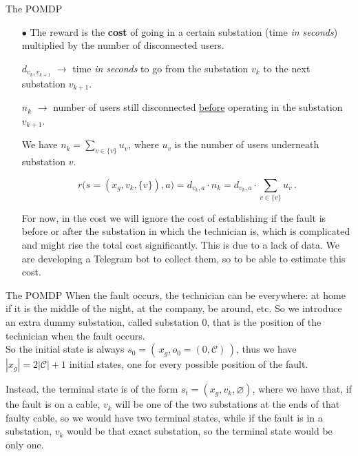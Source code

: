 \documentclass[10pt, aspectratio=169, compress, protectframetitle, handout]{beamer}
\begin{document}
\begin{frame}{The POMDP}

    \begin{itemize}
        \item[\alert{$\bullet$}] The \alert{reward} is the \textbf{cost} of going in a certain substation (time \textit{in seconds}) multiplied by the number of disconnected users.\smallskip
        
        $d_{v_k, v_{k+1}}$ $\longrightarrow$ time \textit{in seconds} to go from the substation $v_k$ to the next substation $v_{k+1}$.\smallskip
        
        $n_{k}$ $\longrightarrow$ number of users still disconnected \underline{before} operating in the substation $v_{k+1}$.\smallskip
        
        We have $n_{k} = \sum_{v \in \{v\}} u_v$, where $u_v$ is the number of users underneath substation $v$.
        
        \smallskip
        \begin{equation}
            r \Big( s = (x_g, v_k, \{v\}), a \Big) = d_{v_k, a} \cdot n_{k} = d_{v_k, a} \cdot \sum_{v \in \{v\}} u_v \,.
            \label{eq:r}
        \end{equation}
        \smallskip

        For now, in the cost we will ignore the cost of establishing if the fault is before or after the substation in which the technician is, which is complicated and might rise the total cost significantly. This is due to a lack of data. We are developing a Telegram bot to collect them, so to be able to estimate this cost.
    \end{itemize}
    
\end{frame}

\begin{frame}{The POMDP}
    When the fault occurs, the technician can be everywhere: at home if it is the middle of the night, at the company, be around, etc. So we introduce an extra dummy substation, called substation $0$, that is the position of the technician when the fault occurs.\\
    So the \alert{initial state} is always $s_0 = ( \, x_g, o_0 = (0, \mathcal C) \, )$, thus we have $|x_g| = 2 |\mathcal C| + 1$ initial states, one for every possible position of the fault. 
    
    \bigskip
    
    Instead, the \alert{terminal state} is of the form $s_t = (x_g, v_k, \varnothing)$, where we have that, if the fault is on a cable, $v_k$ will be one of the two substations at the ends of that faulty cable, so we would have two terminal states, while if the fault is in a substation, $v_k$ would be that exact substation, so the terminal state would be only one.

\end{frame}
\end{document}
